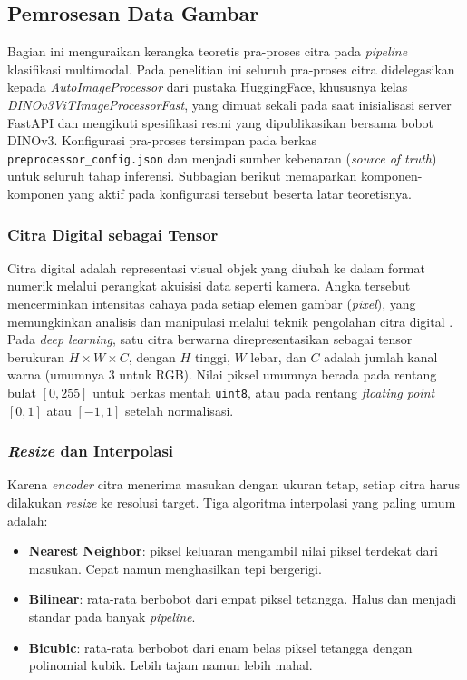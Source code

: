 \subsection{Pemrosesan Data Gambar}
\label{sec:imgproc-detail}

Bagian ini menguraikan kerangka teoretis pra-proses citra pada \textit{pipeline} klasifikasi multimodal. Pada penelitian ini seluruh pra-proses citra didelegasikan kepada \textit{AutoImageProcessor} dari pustaka HuggingFace, khususnya kelas \textit{DINOv3ViTImageProcessorFast}, yang dimuat sekali pada saat inisialisasi server FastAPI dan mengikuti spesifikasi resmi yang dipublikasikan bersama bobot DINOv3. Konfigurasi pra-proses tersimpan pada berkas \texttt{preprocessor\_config.json} dan menjadi sumber kebenaran (\textit{source of truth}) untuk seluruh tahap inferensi. Subbagian berikut memaparkan komponen-komponen yang aktif pada konfigurasi tersebut beserta latar teoretisnya.

\subsubsection{Citra Digital sebagai Tensor}

Citra digital adalah representasi visual objek yang diubah ke dalam format numerik melalui perangkat akuisisi data seperti kamera. Angka tersebut mencerminkan intensitas cahaya pada setiap elemen gambar (\textit{pixel}), yang memungkinkan analisis dan manipulasi melalui teknik pengolahan citra digital \citep{article}. Pada \textit{deep learning}, satu citra berwarna direpresentasikan sebagai tensor berukuran $H \times W \times C$, dengan $H$ tinggi, $W$ lebar, dan $C$ adalah jumlah kanal warna (umumnya 3 untuk RGB). Nilai piksel umumnya berada pada rentang bulat $[0, 255]$ untuk berkas mentah \texttt{uint8}, atau pada rentang \textit{floating point} $[0, 1]$ atau $[-1, 1]$ setelah normalisasi.

\subsubsection{\textit{Resize} dan Interpolasi}

Karena \textit{encoder} citra menerima masukan dengan ukuran tetap, setiap citra harus dilakukan \textit{resize} ke resolusi target. Tiga algoritma interpolasi yang paling umum adalah:

\begin{itemize}
    \item \textbf{Nearest Neighbor}: piksel keluaran mengambil nilai piksel terdekat dari masukan. Cepat namun menghasilkan tepi bergerigi.
    \item \textbf{Bilinear}: rata-rata berbobot dari empat piksel tetangga. Halus dan menjadi standar pada banyak \textit{pipeline}.
    \item \textbf{Bicubic}: rata-rata berbobot dari enam belas piksel tetangga dengan polinomial kubik. Lebih tajam namun lebih mahal.
\end{itemize}

